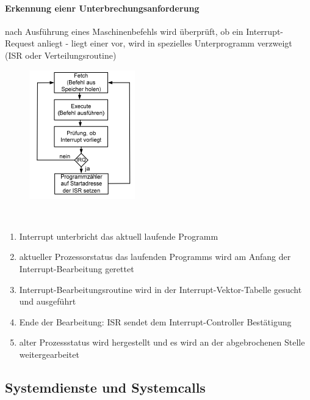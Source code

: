 \documentclass[10pt,a4paper,landscape]{article}
\begin{document}
\begin{multicols*}{3}
	\paragraph{Erkennung eienr Unterbrechungsanforderung} nach Ausführung eines Maschinenbefehls wird überprüft, ob ein Interrupt-Request anliegt - liegt einer vor, wird in spezielles Unterprogramm verzweigt (ISR oder Verteilungsroutine)\\
	\begin{figure}
		\includegraphics[width=0.45\columnwidth,height=0.21\textheight]{interrupt_fetch}
	\end{figure}
	\begin{description}[labelindent=0.0cm]
		\item[Prüfung, ob Interrupt vorliegt]~\par
		\begin{enumerate}[leftmargin=0.0cm]
			\item Interrupt unterbricht das aktuell laufende Programm
			\item aktueller Prozessorstatus das laufenden Programms wird am Anfang der Interrupt-Bearbeitung gerettet
			\item Interrupt-Bearbeitungsroutine wird in der Interrupt-Vektor-Tabelle gesucht und ausgeführt
			\item Ende der Bearbeitung: ISR sendet dem Interrupt-Controller Bestätigung
			\item alter Prozessstatus wird hergestellt und es wird an der abgebrochenen Stelle weitergearbeitet
		\end{enumerate}
	\end{description}
	\subsection{Systemdienste und Systemcalls}

\end{multicols*}
\end{document}
